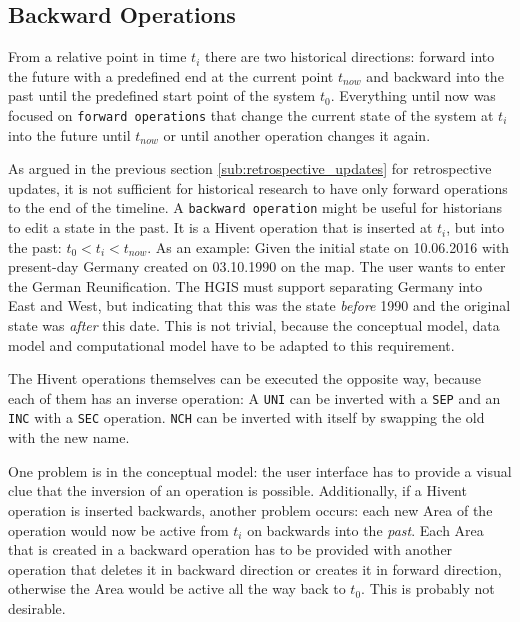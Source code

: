 
\subsection{Backward Operations} %
\label{sub:backward_operations}

From a relative point in time $t_i$ there are two historical directions: forward into the future with a predefined end at the current point $t_{now}$ and backward into the past until the predefined start point of the system $t_0$. Everything until now was focused on \texttt{forward operations} that change the current state of the system at $t_i$ into the future until $t_{now}$ or until another operation changes it again.

As argued in the previous section \ref{sub:retrospective_updates} for retrospective updates, it is not sufficient for historical research to have only forward operations to the end of the timeline.
A \texttt{backward operation} might be useful for historians to edit a state in the past. It is a Hivent operation that is inserted at $t_i$, but into the past: $ t_0 < t_i < t_{now}$. As an example: Given the initial state on 10.06.2016 with present-day Germany created on 03.10.1990 on the map. The user wants to enter the German Reunification. The HGIS must support separating Germany into East and West, but indicating that this was the state \emph{before} 1990 and the original state was \emph{after} this date. This is not trivial, because the conceptual model, data model and computational model have to be adapted to this requirement.

The Hivent operations themselves can be executed the opposite way, because each of them has an inverse operation: A \texttt{UNI} can be inverted with a \texttt{SEP} and an \texttt{INC} with a \texttt{SEC} operation. \texttt{NCH} can be inverted with itself by swapping the old with the new name.

One problem is in the conceptual model: the user interface has to provide a visual clue that the inversion of an operation is possible. Additionally, if a Hivent operation is inserted backwards, another problem occurs: each new Area of the operation would now be active from $t_i$ on backwards into the \emph{past}. Each Area that is created in a backward operation has to be provided with another operation that deletes it in backward direction or creates it in forward direction, otherwise the Area would be active all the way back to $t_0$. This is probably not desirable.


